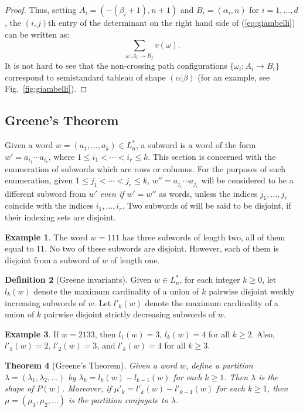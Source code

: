 \documentclass[11pt]{amsproc}
\newtheorem{theorem}{Theorem}[subsection]
\theoremstyle{definition}
\newtheorem{definition}[theorem]{Definition}
\theoremstyle{example}
\newtheorem{example}[theorem]{Example}
\begin{document}
\begin{proof}
  Thus, setting $A_i=(-(\beta_i+1),n+1)$ and $B_i=(\alpha_i,n)$ for $i=1,\dotsc,d$, 
  the $(i,j)$th entry of the determinant on the right hand side of (\ref{eq:giambelli}) can be written as:
  \begin{equation}
    \label{eq:giambelli-det}
    \sum_{\omega:A_i\to B_j} v(\omega).
  \end{equation}
  It is not hard to see that the non-crossing path configurations $\{\omega_i:A_i\to B_i\}$ correspond to semistandard tableau of shape $(\alpha|\beta)$ (for an example, see Fig.~\ref{fig:giambelli}).
\end{proof}
\subsection{Greene's Theorem}
\label{sec:greenes-theorem}
Given a word $w = (a_1,\dotsc,a_k)\in L_n^*$, a subword is a word of the form $w' = a_{i_1}\dotsb a_{i_r}$, where $1\leq i_1<\dotsb < i_r\leq k$.
This section is concerned with the enumeration of subwords which are rows or columns.
For the purposes of such enumeration, given $1 \leq j_1<\dotsb <j_r\leq k$, $w'' = a_{j_1}\dotsb a_{j_r}$ will be considered to be a different subword from $w'$ \emph{even if} $w'=w''$ as words, unless the indices $j_1,\dotsc, j_r$ coincide with the indices $i_1,\dotsc,i_r$.
Two subwords of will be said to be disjoint, if their indexing sets are disjoint.
\begin{example}
  The word $w=111$ has three subwords of length two, all of them equal to $11$.
  No two of these subwords are disjoint.
  However, each of them is disjoint from a subword of $w$ of length one.
\end{example}
\begin{definition}
  [Greene invariants]
  \label{definition:Greene-invars}
  Given $w \in L_n^*$, for each integer $k\geq 0$, let $l_k(w)$ denote the maximum cardinality of a union of $k$ pairwise disjoint weakly increasing subwords of $w$.
  Let $l'_k(w)$ denote the maximum cardinality of a union of $k$ pairwise disjoint strictly decreasing subwords of $w$.
\end{definition}
\begin{example}
  If $w=2133$, then $l_1(w)=3$, $l_k(w)=4$ for all $k\geq 2$.
  Also, $l'_1(w) = 2$, $l'_2(w)=3$, and $l'_k(w)=4$ for all $k\geq 3$.
\end{example}
\begin{theorem}
  [Greene's Theorem]
  \label{theorem:Greene}
  Given a word $w$, define a partition $\lambda=(\lambda_1,\lambda_2,\dotsc)$ by $\lambda_k=l_k(w)-l_{k-1}(w)$ for each $k\geq 1$.
  Then $\lambda$ is the shape of $P(w)$.
  Moreover, if $\mu'_k=l'_k(w)-l'_{k-1}(w)$ for each $k\geq 1$, then $\mu=(\mu_1,\mu_2,\dotsc)$ is the partition conjugate to $\lambda$.
\end{theorem}
\end{document}
